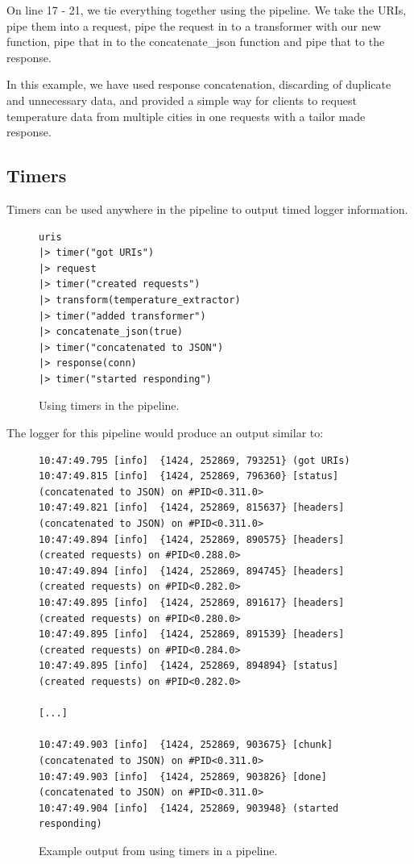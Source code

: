 \documentclass{cslthse-msc}
\begin{document}
On line 17 - 21, we tie everything together using the pipeline. We take the URIs, pipe them into a request, pipe the request in to a transformer with our new function, pipe that in to the concatenate\_json function and pipe that to the response.

In this example, we have used response concatenation, discarding of duplicate and unnecessary data, and provided a simple way for clients to request temperature data from multiple cities in one requests with a tailor made response.

\subsection{Timers}
Timers can be used anywhere in the pipeline to output timed logger information.

\begin{figure}[H]
  \centering
\begin{lstlisting}[breaklines=true,frame=single]
uris
|> timer("got URIs")
|> request
|> timer("created requests")
|> transform(temperature_extractor)
|> timer("added transformer")
|> concatenate_json(true)
|> timer("concatenated to JSON")
|> response(conn)
|> timer("started responding")
\end{lstlisting}
  \caption{Using timers in the pipeline.}
\end{figure}

The logger for this pipeline would produce an output similar to:

\begin{figure}[H]
  \centering
\begin{lstlisting}[breaklines=true,frame=single]
10:47:49.795 [info]  {1424, 252869, 793251} (got URIs)
10:47:49.815 [info]  {1424, 252869, 796360} [status] (concatenated to JSON) on #PID<0.311.0>
10:47:49.821 [info]  {1424, 252869, 815637} [headers] (concatenated to JSON) on #PID<0.311.0>
10:47:49.894 [info]  {1424, 252869, 890575} [headers] (created requests) on #PID<0.288.0>
10:47:49.894 [info]  {1424, 252869, 894745} [headers] (created requests) on #PID<0.282.0>
10:47:49.895 [info]  {1424, 252869, 891617} [headers] (created requests) on #PID<0.280.0>
10:47:49.895 [info]  {1424, 252869, 891539} [headers] (created requests) on #PID<0.284.0>
10:47:49.895 [info]  {1424, 252869, 894894} [status] (created requests) on #PID<0.282.0>

[...]

10:47:49.903 [info]  {1424, 252869, 903675} [chunk] (concatenated to JSON) on #PID<0.311.0>
10:47:49.903 [info]  {1424, 252869, 903826} [done] (concatenated to JSON) on #PID<0.311.0>
10:47:49.904 [info]  {1424, 252869, 903948} (started responding)
\end{lstlisting}
  \caption{Example output from using timers in a pipeline.}
\end{figure}
\end{document}
